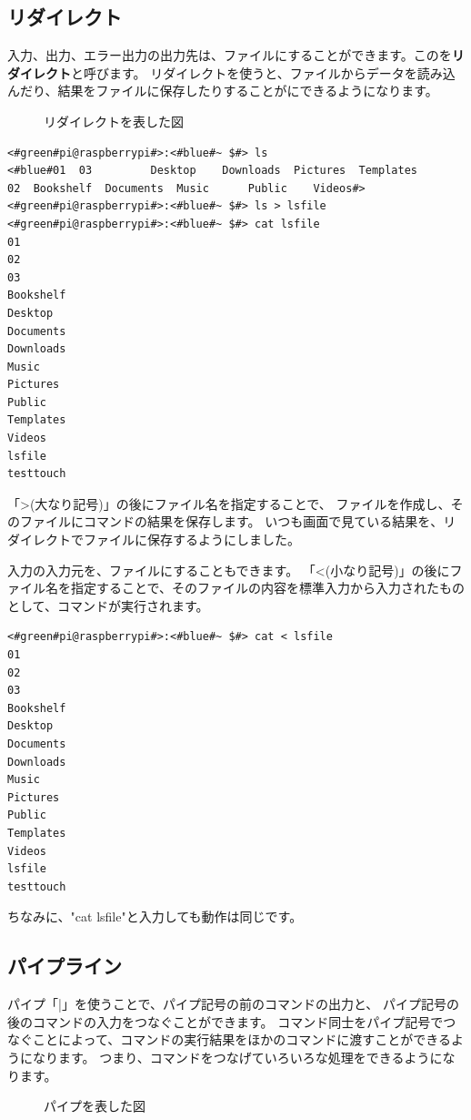 \documentclass[text03.tex]{subfiles}
\begin{document}
\subsection{リダイレクト}
入力、出力、エラー出力の出力先は、ファイルにすることができます。このを{\bf リダイレクト}と呼びます。
リダイレクトを使うと、ファイルからデータを読み込んだり、結果をファイルに保存したりすることがにできるようになります。
\begin{figure}
    \centering
    
    \caption{リダイレクトを表した図}
    \label{ch03:redirect}
\end{figure}
\begin{lstlisting}[caption=lsの出力をリダイレクトする, label=redirectLs]
<#green#pi@raspberrypi#>:<#blue#~ $#> ls 
<#blue#01  03         Desktop    Downloads  Pictures  Templates
02  Bookshelf  Documents  Music      Public    Videos#>
<#green#pi@raspberrypi#>:<#blue#~ $#> ls > lsfile
<#green#pi@raspberrypi#>:<#blue#~ $#> cat lsfile
01
02
03
Bookshelf
Desktop
Documents
Downloads
Music
Pictures
Public
Templates
Videos
lsfile
testtouch
\end{lstlisting}

「>(大なり記号)」の後にファイル名を指定することで、
ファイルを作成し、そのファイルにコマンドの結果を保存します。
いつも画面で見ている結果を、リダイレクトでファイルに保存するようにしました。

入力の入力元を、ファイルにすることもできます。
「<(小なり記号)」の後にファイル名を指定することで、そのファイルの内容を標準入力から入力されたものとして、コマンドが実行されます。
\begin{lstlisting}[caption=catコマンドにリダイレクトでファイルを入力する, label=redirectCat]
<#green#pi@raspberrypi#>:<#blue#~ $#> cat < lsfile
01
02
03
Bookshelf
Desktop
Documents
Downloads
Music
Pictures
Public
Templates
Videos
lsfile
testtouch
\end{lstlisting}

ちなみに、"cat lsfile"と入力しても動作は同じです。

\subsection{パイプライン}\label{sec:pipelne}

パイプ「|」を使うことで、パイプ記号の前のコマンドの出力と、
パイプ記号の後のコマンドの入力をつなぐことができます。
コマンド同士をパイプ記号でつなぐことによって、コマンドの実行結果をほかのコマンドに渡すことができるようになります。
つまり、コマンドをつなげていろいろな処理をできるようになります。
\begin{figure}[h]
    \centering
    
    \caption{パイプを表した図}
    \label{ch03:pipe}
\end{figure}
\end{document}
